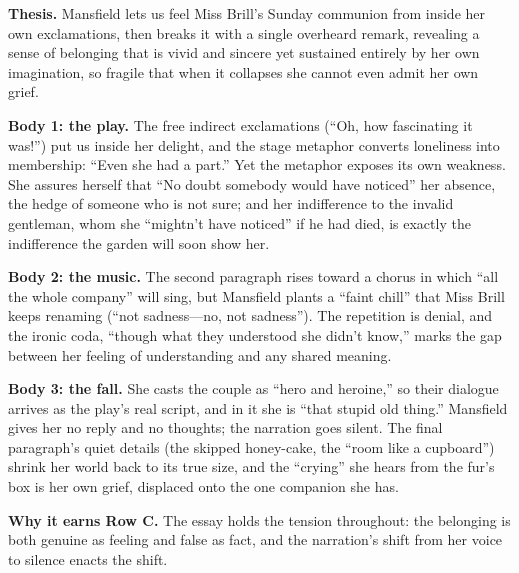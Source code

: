 \documentclass[11pt]{article}
\begin{document}
\begin{modelessay}
\textbf{Thesis.} Mansfield lets us feel Miss Brill's Sunday communion from inside her own exclamations, then breaks it with a single overheard remark, revealing a sense of belonging that is vivid and sincere yet sustained entirely by her own imagination, so fragile that when it collapses she cannot even admit her own grief.

\textbf{Body 1: the play.} The free indirect exclamations (``Oh, how fascinating it was!'') put us inside her delight, and the stage metaphor converts loneliness into membership: ``Even she had a part.'' Yet the metaphor exposes its own weakness. She assures herself that ``No doubt somebody would have noticed'' her absence, the hedge of someone who is not sure; and her indifference to the invalid gentleman, whom she ``mightn't have noticed'' if he had died, is exactly the indifference the garden will soon show her.

\textbf{Body 2: the music.} The second paragraph rises toward a chorus in which ``all the whole company'' will sing, but Mansfield plants a ``faint chill'' that Miss Brill keeps renaming (``not sadness---no, not sadness''). The repetition is denial, and the ironic coda, ``though what they understood she didn't know,'' marks the gap between her feeling of understanding and any shared meaning.

\textbf{Body 3: the fall.} She casts the couple as ``hero and heroine,'' so their dialogue arrives as the play's real script, and in it she is ``that stupid old thing.'' Mansfield gives her no reply and no thoughts; the narration goes silent. The final paragraph's quiet details (the skipped honey-cake, the ``room like a cupboard'') shrink her world back to its true size, and the ``crying'' she hears from the fur's box is her own grief, displaced onto the one companion she has.

\textbf{Why it earns Row C.} The essay holds the tension throughout: the belonging is both genuine as feeling and false as fact, and the narration's shift from her voice to silence enacts the shift.
\end{modelessay}
\end{document}
